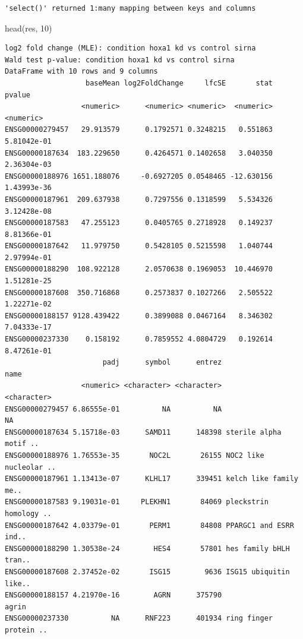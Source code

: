 \documentclass[
  letterpaper,
  DIV=11,
  numbers=noendperiod]{scrartcl}
\newenvironment{Shaded}{\begin{snugshade}}{\end{snugshade}}
\newcommand{\AttributeTok}[1]{\textcolor[rgb]{0.40,0.45,0.13}{#1}}
\newcommand{\DecValTok}[1]{\textcolor[rgb]{0.68,0.00,0.00}{#1}}
\newcommand{\FunctionTok}[1]{\textcolor[rgb]{0.28,0.35,0.67}{#1}}
\newcommand{\NormalTok}[1]{\textcolor[rgb]{0.00,0.23,0.31}{#1}}
\newcommand{\OtherTok}[1]{\textcolor[rgb]{0.00,0.23,0.31}{#1}}
\newcommand{\SpecialCharTok}[1]{\textcolor[rgb]{0.37,0.37,0.37}{#1}}
\newcommand{\StringTok}[1]{\textcolor[rgb]{0.13,0.47,0.30}{#1}}
\begin{document}
\begin{Shaded}
\end{Shaded}

\begin{verbatim}
'select()' returned 1:many mapping between keys and columns
\end{verbatim}

\begin{Shaded}
\begin{Highlighting}[]
\FunctionTok{head}\NormalTok{(res, }\DecValTok{10}\NormalTok{)}
\end{Highlighting}
\end{Shaded}

\begin{verbatim}
log2 fold change (MLE): condition hoxa1 kd vs control sirna 
Wald test p-value: condition hoxa1 kd vs control sirna 
DataFrame with 10 rows and 9 columns
                   baseMean log2FoldChange     lfcSE       stat      pvalue
                  <numeric>      <numeric> <numeric>  <numeric>   <numeric>
ENSG00000279457   29.913579      0.1792571 0.3248215   0.551863 5.81042e-01
ENSG00000187634  183.229650      0.4264571 0.1402658   3.040350 2.36304e-03
ENSG00000188976 1651.188076     -0.6927205 0.0548465 -12.630156 1.43993e-36
ENSG00000187961  209.637938      0.7297556 0.1318599   5.534326 3.12428e-08
ENSG00000187583   47.255123      0.0405765 0.2718928   0.149237 8.81366e-01
ENSG00000187642   11.979750      0.5428105 0.5215598   1.040744 2.97994e-01
ENSG00000188290  108.922128      2.0570638 0.1969053  10.446970 1.51281e-25
ENSG00000187608  350.716868      0.2573837 0.1027266   2.505522 1.22271e-02
ENSG00000188157 9128.439422      0.3899088 0.0467164   8.346302 7.04333e-17
ENSG00000237330    0.158192      0.7859552 4.0804729   0.192614 8.47261e-01
                       padj      symbol      entrez                   name
                  <numeric> <character> <character>            <character>
ENSG00000279457 6.86555e-01          NA          NA                     NA
ENSG00000187634 5.15718e-03      SAMD11      148398 sterile alpha motif ..
ENSG00000188976 1.76553e-35       NOC2L       26155 NOC2 like nucleolar ..
ENSG00000187961 1.13413e-07      KLHL17      339451 kelch like family me..
ENSG00000187583 9.19031e-01     PLEKHN1       84069 pleckstrin homology ..
ENSG00000187642 4.03379e-01       PERM1       84808 PPARGC1 and ESRR ind..
ENSG00000188290 1.30538e-24        HES4       57801 hes family bHLH tran..
ENSG00000187608 2.37452e-02       ISG15        9636 ISG15 ubiquitin like..
ENSG00000188157 4.21970e-16        AGRN      375790                  agrin
ENSG00000237330          NA      RNF223      401934 ring finger protein ..
\end{verbatim}
\end{document}
